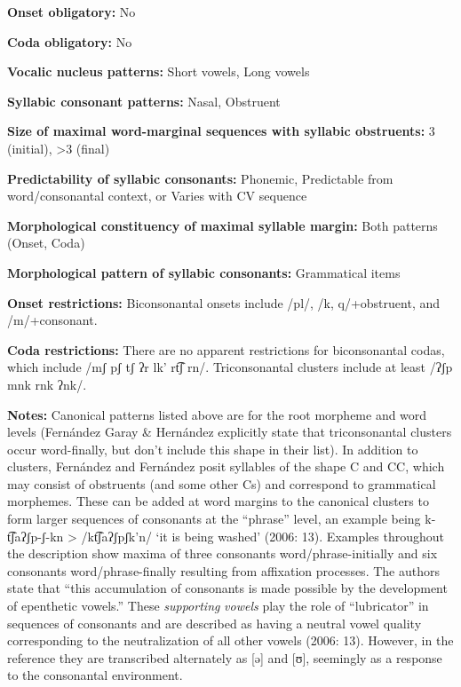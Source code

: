 \textbf{Onset obligatory:} No



\textbf{Coda obligatory:} No



\textbf{Vocalic nucleus patterns:} Short vowels, Long vowels



\textbf{Syllabic consonant patterns:} Nasal, Obstruent



\textbf{Size of maximal word{}-marginal sequences with syllabic obstruents:} 3 (initial), >3 (final)



\textbf{Predictability of syllabic consonants:} Phonemic, Predictable from word/consonantal context, or Varies with CV sequence



\textbf{Morphological constituency of maximal syllable margin:} Both patterns (Onset, Coda)



\textbf{Morphological pattern of syllabic consonants:} Grammatical items



\textbf{Onset restrictions:} Biconsonantal onsets include /pl/, /k, q/+obstruent, and /m/+consonant.



\textbf{Coda restrictions:} There are no apparent restrictions for biconsonantal codas, which include /mʃ pʃ tʃ ʔr lk' rt͡ʃ rn/. Triconsonantal clusters include at least /ʔʃp mnk rnk ʔnk/.



\textbf{Notes:} Canonical patterns listed above are for the root morpheme and word levels (Fernández Garay \& Hernández explicitly state that triconsonantal clusters occur word-finally, but don’t include this shape in their list). In addition to clusters, Fernández \citet{Garay1998} and Fernández \citet{GarayHernández2006} posit syllables of the shape C and CC, which may consist of obstruents (and some other Cs) and correspond to grammatical morphemes. These can be added at word margins to the canonical clusters to form larger sequences of consonants at the “phrase” level, an example being k{}-t͡ʃaʔʃp{}-ʃ{}-kn > /kt͡ʃaʔʃpʃk’n/ ‘it is being washed’ (2006: 13). Examples throughout the description show maxima of three consonants word/phrase-initially and six consonants word/phrase-finally resulting from affixation processes. The authors state that “this accumulation of consonants is made possible by the development of epenthetic vowels.” These \textit{supporting} \textit{vowels} play the role of “lubricator” in sequences of consonants and are described as having a neutral vowel quality corresponding to the neutralization of all other vowels (2006: 13). However, in the  reference they are transcribed alternately as [ə] and [ʊ], seemingly as a response to the consonantal environment.




